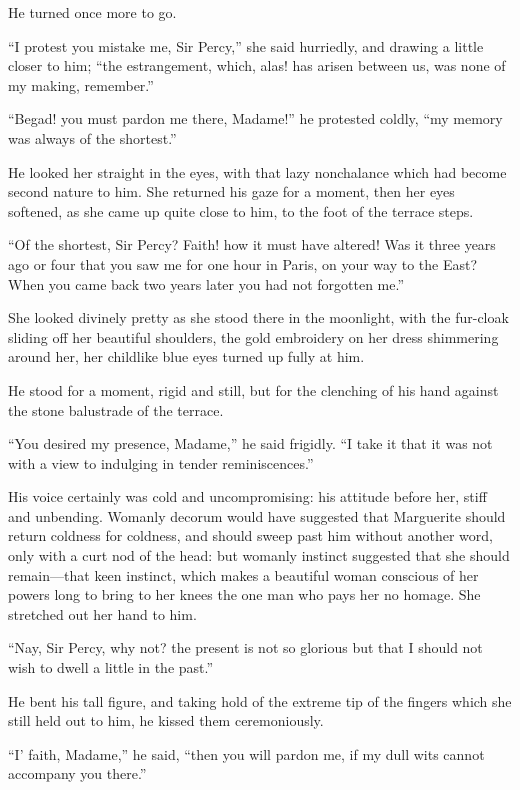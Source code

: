 \documentclass[paper=a5,BCOR=7mm,twoside,DIV=calc,12pt,usegeometry,chapterprefix,endperiod,headings=big]{scrbook}
\begin{document}
He turned once more to go.

\enquote{I protest you mistake me, Sir Percy,} she said hurriedly, and drawing a little closer to him; \enquote{the estrangement, which, alas! has arisen between us, was none of my making, remember.}

\enquote{Begad! you must pardon me there, Madame!} he protested coldly, \enquote{my memory was always of the shortest.}

He looked her straight in the eyes, with that lazy nonchalance which had become second nature to him. She returned his gaze for a moment, then her eyes softened, as she came up quite close to him, to the foot of the terrace steps.

\enquote{Of the shortest, Sir Percy? Faith! how it must have altered! Was it three years ago or four that you saw me for one hour in Paris, on your way to the East? When you came back two years later you had not forgotten me.}

She looked divinely pretty as she stood there in the moonlight, with the fur-cloak sliding off her beautiful shoulders, the gold embroidery on her dress shimmering around her, her childlike blue eyes turned up fully at him.

He stood for a moment, rigid and still, but for the clenching of his hand against the stone balustrade of the terrace.

\enquote{You desired my presence, Madame,} he said frigidly. \enquote{I take it that it was not with a view to indulging in tender reminiscences.}

His voice certainly was cold and uncompromising: his attitude before her, stiff and unbending. Womanly decorum would have suggested that Marguerite should return coldness for coldness, and should sweep past him without another word, only with a curt nod of the head: but womanly instinct suggested that she should remain---that keen instinct, which makes a beautiful woman conscious of her powers long to bring to her knees the one man who pays her no homage. She stretched out her hand to him.

\enquote{Nay, Sir Percy, why not? the present is not so glorious but that I should not wish to dwell a little in the past.}

He bent his tall figure, and taking hold of the extreme tip of the fingers which she still held out to him, he kissed them ceremoniously.

\enquote{I’ faith, Madame,} he said, \enquote{then you will pardon me, if my dull wits cannot accompany you there.}
\end{document}
